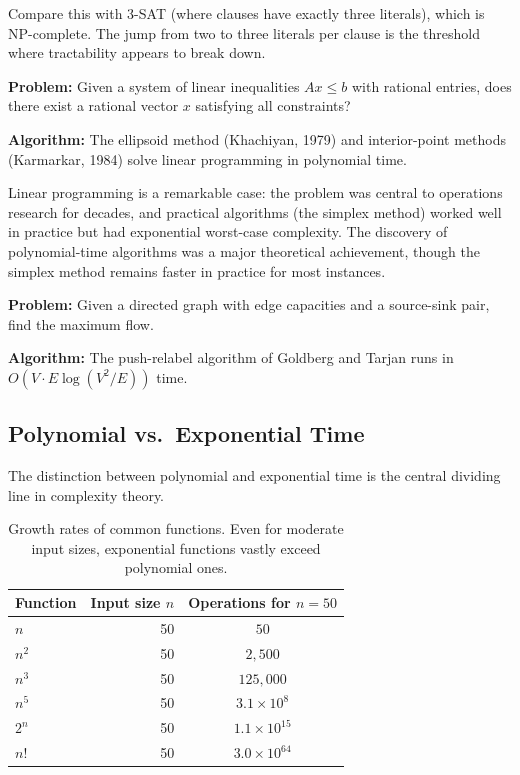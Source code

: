 Compare this with 3-SAT (where clauses have exactly three literals), which is NP-complete. The jump from two to three literals per clause is the threshold where tractability appears to break down.

\begin{example}
\textbf{Problem:} Given a system of linear inequalities $Ax \leq b$ with rational entries, does there exist a rational vector $x$ satisfying all constraints?
\par\textbf{Algorithm:} The ellipsoid method (Khachiyan, 1979) and interior-point methods (Karmarkar, 1984) solve linear programming in polynomial time.
\end{example}

Linear programming is a remarkable case: the problem was central to operations research for decades, and practical algorithms (the simplex method) worked well in practice but had exponential worst-case complexity. The discovery of polynomial-time algorithms was a major theoretical achievement, though the simplex method remains faster in practice for most instances.

\begin{example}
\textbf{Problem:} Given a directed graph with edge capacities and a source-sink pair, find the maximum flow.
\par\textbf{Algorithm:} The push-relabel algorithm of Goldberg and Tarjan runs in $O(V \cdot E \log(V^2/E))$ time.
\end{example}

\subsection{Polynomial vs.\ Exponential Time}

The distinction between polynomial and exponential time is the central dividing line in complexity theory.

\begin{table}[ht]
\centering
\begin{tabular}{lrc}
\toprule
\textbf{Function} & \textbf{Input size $n$} & \textbf{Operations for $n = 50$} \\
\midrule
$n$ & 50 & $50$ \\
$n^2$ & 50 & $2{,}500$ \\
$n^3$ & 50 & $125{,}000$ \\
$n^5$ & 50 & $3.1 \times 10^8$ \\
$2^n$ & 50 & $1.1 \times 10^{15}$ \\
$n!$ & 50 & $3.0 \times 10^{64}$ \\
\bottomrule
\end{tabular}
\caption{Growth rates of common functions. Even for moderate input sizes, exponential functions vastly exceed polynomial ones.}
\label{tab:growth}
\end{table}

